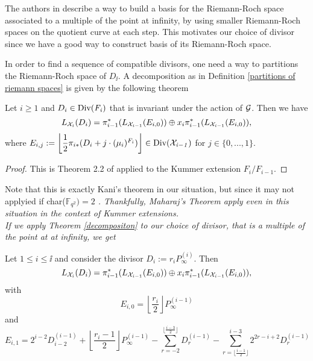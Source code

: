 \documentclass[10pt]{article}
\begin{document}
\s

\begin{rq1} \label{choice of P_inf} \rm
The authors in \cite{NOQ} describe a way to build a basis for the Riemann-Roch space associated to a multiple of the point at infinity, by using smaller Riemann-Roch spaces on the quotient curve at each step. This motivates our choice of divisor since we have a good way to construct basis of its Riemann-Roch space.
\end{rq1}

\s

In order to find a sequence of compatible divisors, one need a way to partitions the Riemann-Roch space of $D_{\ii}$. A decomposition as in Definition \ref{partitions of riemann spaces} is given by the following theorem 

\s

\begin{theorem} \label{decompositon}
Let $i \geq 1$ and $D_i \in \rm Div \it (F_i)$ that is invariant under the action of $\mathcal{G}$. Then we have 
\[L_{\mathcal{X}_i}(D_i) = \pi_{i-1}^*(L_{\mathcal{X}_{i-1}}(E_{i,0})) \oplus  x_i \pi_{i-1}^*(L_{\mathcal{X}_{i-1}}(E_{i,0})),\]
where $E_{i,j} := \left\lfloor \dfrac{1}{2} \pi_{i*}(D_i+j \cdot (\mu_i)^{F_i})\right\rfloor \in \rm Div \it (\mathcal{X}_{i-1})$ for $j \in \{0,...,1\}$.
\end{theorem}

\s

\begin{proof}
This is Theorem 2.2 of \cite{MAH} applied to the Kummer extension $F_i/F_{i-1}$.
\end{proof}

\s

Note that this is exactly Kani's theorem in our situation, but since it may not applyied if char(\it $\mathbb{F}_{q^2})=2$ \rm . Thankfully, Maharaj's Theorem apply even in this situation in the context of Kummer extensions. \\
If we apply Theorem \ref{decompositon} to our choice of divisor, that is a multiple of the point at at infinity, we get

\s

\begin{corollary} \label{our decomposition}
Let $1 \leq i \leq \ii$ and consider the divisor $D_i := r_i P_{\infty}^{(i)}$. Then
\[ L_{\mathcal{X}_i}(D_i) = \pi_{i-1}^*(L_{\mathcal{X}_{i-1}}(E_{i,0})) \oplus  x_i \pi_{i-1}^*(L_{\mathcal{X}_{i-1}}(E_{i,0})),\]
with 
\[E_{i,0} = \left \lfloor \frac{r_i}{2}\right\rfloor P_{\infty}^{(i-1)}\]
and 
\[E_{i,1} = 2^{i-2}D_{i-2}^{(i-1)} + \left \lfloor \frac{r_i-1}{2}\right\rfloor P_{\infty}^{(i-1)} - \sum\limits_{r=-2}^{\lfloor \frac{i-3}{2}\rfloor} D_r^{(i-1)} - \sum\limits_{r=\lfloor \frac{i-1}{2}\rfloor}^{i-3} 2^{2r-i+2}D_r^{(i-1)}\]
\end{corollary}
\end{document}
